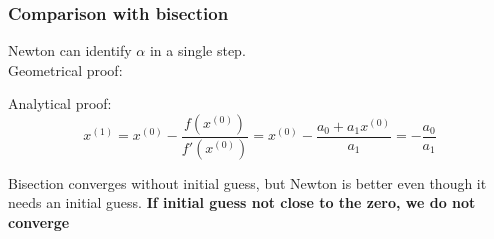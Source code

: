 \subsubsection{Comparison with bisection}
Newton can identify $\alpha$ in a single step.\\
Geometrical proof:

\begin{figure}[!ht]
    \begin{minipage}{\linewidth}
        \centering
    \end{minipage}
\end{figure}

Analytical proof:
$$x^{(1)}=x^{(0)}-\frac{f(x^{(0)})}{f'(x^{(0)})}=x^{(0)}-\frac{
    a_0+a_1x^{(0)}
}{a_1}=-\frac{a_0}{a_1}$$

Bisection converges without initial guess, but Newton is better even though it needs an initial guess. \textbf{If initial guess not close to the zero, we do not converge}

